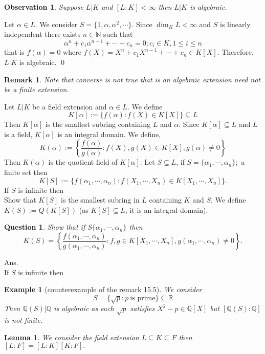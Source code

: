 \documentclass[11pt]{amsart}
\newtheorem{qns}[theorem]{Question}
\newtheorem{eg}[theorem]{Example}
\newtheorem{obs}[theorem]{Observation}
\newtheorem{remark}[theorem]{Remark}%
\newtheorem{lemma}[theorem]{Lemma}%
\newcommand{\QQ}{\mathbb Q}
\newcommand{\RR}{\mathbb R}
\newcommand{\NN}{\mathbb N}
\begin{document}
\begin{obs}
Suppose $L|K$ and $[L:K]<\infty$ then $L|K$ is algebraic.
\end{obs}
\proof Let $\alpha\in L.$ We consider $S=\{1,\alpha,\alpha^2,\cdots\}$. Since $\dim_K L<\infty$ and $S$ is linearly independent there exists $n\in {\NN}$ such that $$\alpha^n+c_1\alpha^{n-1}+\cdots+c_n=0;c_i\in K,1\leq i\leq n$$ that is $f(\alpha)=0$ where $f(X)=X^n+c_1X^{n-1}+\cdots+c_n\in K[X].$ Therefore, $L|K$ is algebraic. \qed
\begin{remark}
Note that converse is not true that is an algebraic extension need not be a finite extension.
\end{remark}
Let $L|K$ be a field extension and $\alpha\in L$. We define $$K[\alpha]:=\{f(\alpha):f(X)\in K[X]\}\subseteq L$$
Then $K[\alpha]$ is the smallest subring containing $L$ and $\alpha$. Since $K[\alpha]\subseteq L$ and $L$ is a field, $K[\alpha]$ is an integral domain. We define, $$K(\alpha):=\left\lbrace\dfrac{f(\alpha)}{g(\alpha)}:f(X),g(X)\in K[X],g(\alpha)\neq 0\right\rbrace$$ Then $K(\alpha)$ is the quotient field of $K[\alpha]$. Let $S\subseteq L$, if $S=\{\alpha_1,\cdots,\alpha_n\};$ a finite set then $$K[S]:=\{f(\alpha_1,\cdots,\alpha_n):f(X_1,\cdots,X_n)\in K[X_1,\cdots,X_n]\}.$$ If $S$ is infinite then\\
Show that $K[S]$ is the smallest subring in $L$ containing $K$ and $S.$ We define $K(S):=Q(K[S])$ (as $K[S]\subseteq L$, it is an integral domain).
\begin{qns}
Show that if $S\{\alpha_1,\cdots,\alpha_n\}$ then $$K(S)=\left\lbrace \dfrac{f(\alpha_1,\cdots,\alpha_n)}{g(\alpha_1,\cdots,\alpha_n)}:f,g\in K[X_1,\cdots,X_n],g(\alpha_1,\cdots,\alpha_n)\neq 0\right\rbrace.$$
\end{qns}
Ans.\\
If $S$ is infinite then\\

\begin{eg}[counterexample of the remark 15.5]
We consider $$S=\{\sqrt{p}:p~\text{is prime}\}\subseteq{\RR}$$ Then ${\QQ}(S)|{\QQ}$ is algebraic as each $\sqrt{p}$ satisfies $X^2-p\in {\QQ}[X]$ but $[{\QQ}(S):{\QQ}]$ is not finite.
\end{eg}
\begin{lemma}
We consider the field extension $L\subseteq K\subseteq F$ then $[L:F]=[L:K][K:F].$
\end{lemma}
\proof
\end{document}
